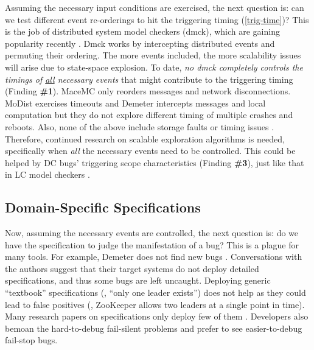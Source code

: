 Assuming the necessary input conditions are exercised, the next
question is: can we test different event re-orderings to hit the
triggering timing (\sec\ref{trig-time})?  This is the job of
distributed system model checkers (dmck), which are gaining popularity
recently \cite{Guo+11-Demeter, 
Killian+07-LifeDeathMaceMC,
  Simsa+10-Dbug,
  Yang+09-Modist}.  Dmck works by intercepting distributed events and
permuting their ordering.  The more events included, the more
scalability issues will arise due to state-space explosion.
%
To date, {\em no dmck completely controls the timings of
  \underline{all} necessary events} that might contribute to the
triggering timing (Finding {\bf \#1}).  MaceMC
\cite{Killian+07-LifeDeathMaceMC} only reorders messages and network
disconnections.  MoDist \cite{Guo+11-Demeter} exercises timeouts and
Demeter \cite{Guo+11-Demeter} intercepts messages and local
computation but they do not explore different timing of multiple
crashes and reboots. Also, none of the above include storage faults
or timing issues \cite{Hao+16-TailAtStore}.
%
Therefore, continued research on scalable exploration algorithms is
needed, specifically 
when {\em all} the necessary events need to be controlled.
This could be helped by DC bugs' triggering scope characteristics
(Finding {\bf \#3}), just like that in
LC model checkers \cite{madanpldi07}.


\subsection{Domain-Specific Specifications}
\label{less-spec}

Now, assuming the necessary events are controlled, the next question
is: do we have the specification to judge the manifestation of a bug?  
This is a plague for many tools. For example,
Demeter does not find new bugs \cite{Guo+11-Demeter}.
Conversations with the authors suggest that their target systems do
not deploy detailed specifications, and thus some bugs are left
uncaught.  Deploying generic ``textbook'' specifications (\eg, ``only
one leader exists'') does not help as they could lead to false
positives (\eg, ZooKeeper allows two leaders at a single point in
time).  Many research papers on specifications only deploy few of them
\cite{Gunawi+11-FateDestini, Liu+08-D3S, Reynolds+06-Pip}.
Developers also
bemoan the hard-to-debug fail-silent problems  and
prefer to see easier-to-debug fail-stop bugs.  
%

